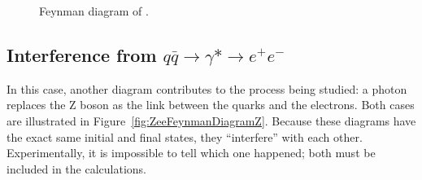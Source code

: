 \begin{figure}[htb]
\begin{center}
\end{center}
  \caption[Feynman diagram of \qqZee]
	  {Feynman diagram of \qqZee.  
	    }
  \label{fig:ZeeFeynmanDiagram}
\end{figure}

\subsection{Interference from $q \bar{q} \rightarrow \gamma* \rightarrow e^+ e^-$}
In this case, another diagram contributes 
to the process being studied: 
a photon replaces the Z boson 
as the link between the quarks and the electrons.  
Both cases are illustrated in 
Figure~\ref{fig:ZeeFeynmanDiagramZ}. 
Because these diagrams have the exact same 
initial and final states, 
they ``interfere'' with each other.  
Experimentally, it is impossible to tell which one happened; 
both must be included in the calculations.  %

